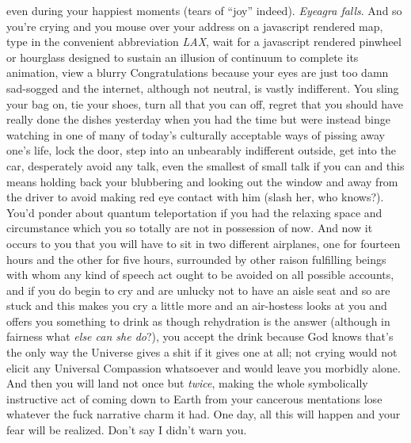 \documentclass{article}
\begin{document}
even during your happiest moments (tears of ``joy'' indeed).
\textit{Eyeagra falls}. And so you're crying and you mouse over your
address on a javascript rendered map, type in the convenient
abbreviation \textit{LAX}, wait for a javascript rendered pinwheel or
hourglass designed to sustain an illusion of continuum to complete its
animation, view a blurry Congratulations because your eyes are just too
damn sad-sogged and the internet, although not neutral, is vastly
indifferent. You sling your bag on, tie your shoes, turn all that you
can off, regret that you should have really done the dishes yesterday
when you had the time but were instead binge watching in one of many of
today's culturally acceptable ways of pissing away one's life, lock the
door, step into an unbearably indifferent outside, get into the car,
desperately avoid any talk, even the smallest of small talk if you can
and this means holding back your blubbering and looking out the window
and away from the driver to avoid making red eye contact with him (slash
her, who knows?). You'd ponder about quantum teleportation if you had
the relaxing space and circumstance which you so totally are not in
possession of now. And now it occurs to you that you will have to sit in
two different airplanes, one for fourteen hours and the other for five
hours, surrounded by other raison fulfilling beings with whom any kind
of speech act ought to be avoided on all possible accounts, and if you
do begin to cry and are unlucky not to have an aisle seat and so are
stuck and this makes you cry a little more and an air-hostess looks at
you and offers you something to drink as though rehydration is the
answer (although in fairness what \textit{else can she do}?), you accept
the drink because God knows that's the only way the Universe gives
a shit if it gives one at all; not crying would not elicit any Universal
Compassion whatsoever and would leave you morbidly alone. And then you
will land not once but \textit{twice}, making the whole symbolically
instructive act of coming down to Earth from your cancerous mentations
lose whatever the fuck narrative charm it had. One day, all this will
happen and your fear will be realized. Don't say I didn't warn you.
\end{document}

